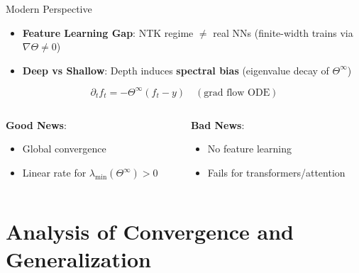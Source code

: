 \documentclass[serif, aspectratio=169]{beamer}
\begin{document}
\begin{frame}{Modern Perspective}
	\begin{itemize}
		\item \textbf{Feature Learning Gap}: NTK regime \(\neq\) real NNs (finite-width trains via \(\nabla\Theta \neq 0\))
		\item \textbf{Deep vs Shallow}: Depth induces \textbf{spectral bias} (eigenvalue decay of \(\Theta^\infty\))
	\end{itemize}
	
	\[
	\partial_t f_t = -\Theta^\infty(f_t - y) \quad (\text{grad flow ODE})
	\]
	
	\vspace{1em}
	\begin{columns}
		\begin{column}{0.5\textwidth}
			\textbf{Good News}:
			\begin{itemize}
				\item Global convergence
				\item Linear rate for \(\lambda_{\min}(\Theta^\infty) > 0\)
			\end{itemize}
		\end{column}
		\begin{column}{0.5\textwidth}
			\textbf{Bad News}:
			\begin{itemize}
				\item No feature learning
				\item Fails for transformers/attention
			\end{itemize}
		\end{column}
	\end{columns}
\end{frame}

\section{Analysis of Convergence and Generalization}
\end{document}
